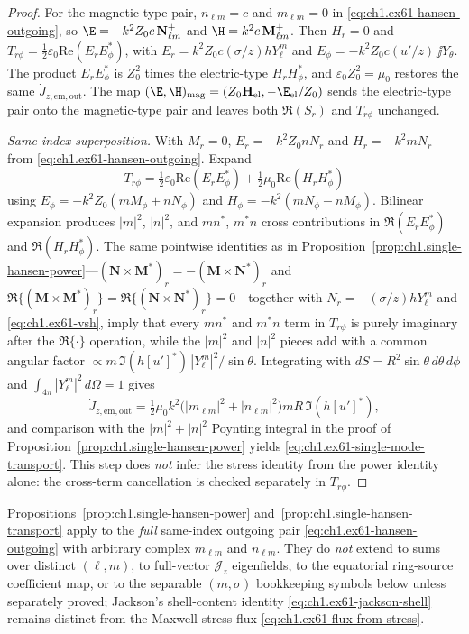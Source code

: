 \begin{proof}
For the magnetic-type pair, $n_{\ell m}=c$ and $m_{\ell m}=0$ in \eqref{eq:ch1.ex61-hansen-outgoing}, so $\E=-k^2 Z_0 c\,\mathbf N_{\ell m}^+$ and $\H=k^2 c\,\mathbf M_{\ell m}^+$. Then $H_r=0$ and $T_{r\phi}=\tfrac12\varepsilon_0\mathrm{Re}(E_r E_\phi^*)$, with $E_r=k^2 Z_0 c(\sigma/z)h Y_\ell^m$ and $E_\phi=-k^2 Z_0 c(u'/z)\,\jj Y_\theta$. The product $E_r E_\phi^*$ is $Z_0^2$ times the electric-type $H_r H_\phi^*$, and $\varepsilon_0 Z_0^2=\mu_0$ restores the same $\dot J_{z,\mathrm{em,out}}$. The map $(\E,\H)_{\mathrm{mag}}=(Z_0\mathbf H_{\mathrm{el}},-\E_{\mathrm{el}}/Z_0)$ sends the electric-type pair onto the magnetic-type pair and leaves both $\Re(S_r)$ and $T_{r\phi}$ unchanged.

\medskip\noindent\emph{Same-index superposition.}
With $M_r=0$, $E_r=-k^2 Z_0 n N_r$ and $H_r=-k^2 m N_r$ from \eqref{eq:ch1.ex61-hansen-outgoing}. Expand
\[
T_{r\phi}
=\tfrac12\varepsilon_0\mathrm{Re}(E_r E_\phi^*)
+\tfrac12\mu_0\mathrm{Re}(H_r H_\phi^*)
\]
using $E_\phi=-k^2 Z_0(m M_\phi+n N_\phi)$ and $H_\phi=-k^2(m N_\phi-n M_\phi)$. Bilinear expansion produces $|m|^2$, $|n|^2$, and $mn^*$, $m^*n$ cross contributions in $\Re(E_r E_\phi^*)$ and $\Re(H_r H_\phi^*)$. The same pointwise identities as in Proposition~\ref{prop:ch1.single-hansen-power}---$(\mathbf N\times\mathbf M^*)_r=-(\mathbf M\times\mathbf N^*)_r$ and $\Re\{(\mathbf M\times\mathbf M^*)_r\}=\Re\{(\mathbf N\times\mathbf N^*)_r\}=0$---together with $N_r=-(\sigma/z)h Y_\ell^m$ and \eqref{eq:ch1.ex61-vsh}, imply that every $mn^*$ and $m^*n$ term in $T_{r\phi}$ is purely imaginary after the $\Re\{\cdot\}$ operation, while the $|m|^2$ and $|n|^2$ pieces add with a common angular factor $\propto m\,\Im(h[u']^*)\,|Y_\ell^m|^2/\sin\theta$. Integrating with $dS=R^2\sin\theta\,d\theta\,d\phi$ and $\int_{4\pi}|Y_\ell^m|^2\,d\Omega=1$ gives
\[
\dot J_{z,\mathrm{em,out}}=\tfrac12\mu_0 k^2\bigl(|m_{\ell m}|^2+|n_{\ell m}|^2\bigr) m R\,\Im(h[u']^*),
\]
and comparison with the $|m|^2+|n|^2$ Poynting integral in the proof of Proposition~\ref{prop:ch1.single-hansen-power} yields \eqref{eq:ch1.ex61-single-mode-transport}. This step does \emph{not} infer the stress identity from the power identity alone: the cross-term cancellation is checked separately in $T_{r\phi}$.
\end{proof}

\begin{remark}
\label{rem:ch1.single-multipole-scope}
Propositions~\ref{prop:ch1.single-hansen-power} and~\ref{prop:ch1.single-hansen-transport} apply to the \emph{full} same-index outgoing pair \eqref{eq:ch1.ex61-hansen-outgoing} with arbitrary complex $m_{\ell m}$ and $n_{\ell m}$. They do \emph{not} extend to sums over distinct $(\ell,m)$, to full-vector $\mathcal{J}_z$ eigenfields, to the equatorial ring-source coefficient map, or to the separable $(m,\sigma)$ bookkeeping symbols below unless separately proved; Jackson's shell-content identity \eqref{eq:ch1.ex61-jackson-shell} remains distinct from the Maxwell-stress flux \eqref{eq:ch1.ex61-flux-from-stress}.
\end{remark}

